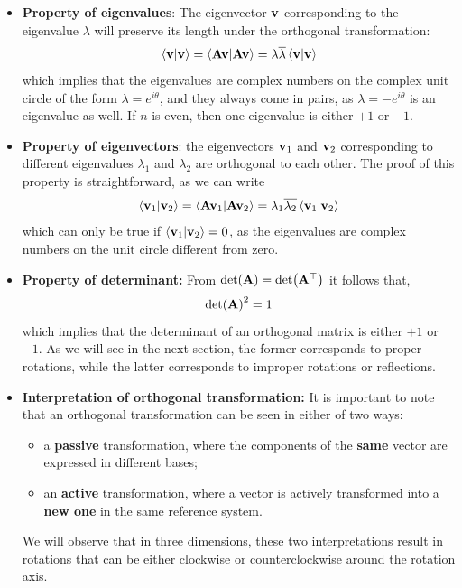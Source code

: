 \documentclass[12pt]{article}
\begin{document}
\begin{itemize}
  \item \textbf{Property of eigenvalues}: The eigenvector $\vb{v}$ corresponding to the
        eigenvalue $\lambda$ will preserve its length under the orthogonal transformation:
        \begin{equation}
          \ip{\vb{v}}{\vb{v}} = \ip{\vb{A}\vb{v}}{\vb{A}\vb{v}} = \lambda\overline{\lambda}\ip{\vb{v}}{\vb{v}}
        \end{equation}
        which implies that the eigenvalues are complex numbers on the complex unit circle of
        the form $\lambda = e^{i\theta}$, and they always come in pairs, as
        $\lambda = -e^{i\theta}$ is an eigenvalue as well. If $n$ is even, then one eigenvalue
        is either $+1$ or $-1$.

  \item \textbf{Property of eigenvectors}: the eigenvectors $\vb{v}_1$ and $\vb{v}_2$
        corresponding to different eigenvalues $\lambda_1$ and $\lambda_2$ are orthogonal to
        each other. The proof of this property is straightforward, as we can write
        \begin{equation}
          \ip{\vb{v}_1}{\vb{v}_2} = \ip{\vb{A}\vb{v}_1}{\vb{A}\vb{v}_2} = \lambda_1\overline{\lambda_2}\ip{\vb{v}_1}{\vb{v}_2}
        \end{equation}
        which can only be true if $\ip{\vb{v}_1}{\vb{v}_2} = 0$, as the eigenvalues are
        complex numbers on the unit circle different from zero.

  \item \textbf{Property of determinant:} From $\det(\vb{A}) = \det(\vb{A}^\top)$ it follows
        that,
        \begin{equation}
          \det(\vb{A})^2 = 1
        \end{equation}
        which implies that the determinant of an orthogonal matrix is either $+1$ or $-1$.
        As we will see in the next section, the former corresponds to proper rotations, while
        the latter corresponds to improper rotations or reflections.

  \item \textbf{Interpretation of orthogonal transformation:} It is important to note that
        an orthogonal transformation can be seen in either of two ways:
        \begin{itemize}
          \item a \textbf{passive} transformation, where the components of the \textbf{same}
                vector are expressed in different bases;
          \item an \textbf{active} transformation, where a vector is actively transformed into
                a \textbf{new one} in the same reference system.
        \end{itemize}
        We will observe that in three dimensions, these two interpretations result in rotations
        that can be either clockwise or counterclockwise around the rotation axis.
\end{itemize}
\end{document}
